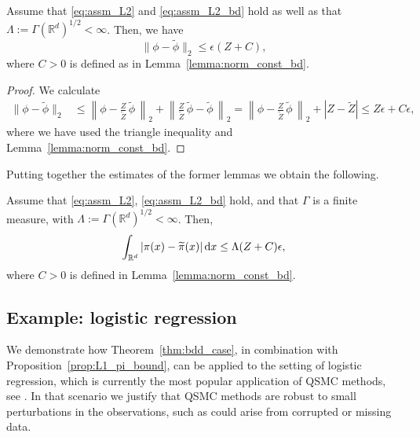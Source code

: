 \documentclass{aptpub}
\begin{document}
\begin{lemma}
    Assume that \eqref{eq:assm_L2} and \eqref{eq:assm_L2_bd} hold as well as that $\Lambda:= \Gamma(\mathbb{R}^d)^{1/2}<\infty$. Then, we have
    \begin{equation*}
        \|\phi-\widetilde \phi\|_2 \le \epsilon(Z+C),
    \end{equation*}
    where $C>0$ is defined as in Lemma~\ref{lemma:norm_const_bd}.
    \label{lemma:phi_2-bound}
\end{lemma}
\begin{proof}
    We calculate
    \begin{equation*}
        \begin{split}
            \|\phi-\widetilde \phi\|_2 &\le \left \|\phi - \frac{Z}{\widetilde Z}\,\widetilde \phi\,\right \|_2+\left \| \frac{Z}{\widetilde Z}\,\widetilde \phi - \widetilde \phi \,\right\|_2
            = \left \|\phi - \frac{Z}{\widetilde Z}\,\widetilde \phi\,\right \|_2+|Z-\widetilde Z| 
            \le Z\epsilon + C\epsilon, 
        \end{split}
    \end{equation*}
    where we have used the triangle inequality and Lemma~\ref{lemma:norm_const_bd}.
\end{proof}
Putting together the estimates of the former lemmas we obtain the following.
\begin{proposition}
    Assume that \eqref{eq:assm_L2}, \eqref{eq:assm_L2_bd} hold, and that $\Gamma$ is a finite measure, with $\Lambda := \Gamma(\mathbb{R}^d)^{1/2}<\infty$. Then, 
    \begin{equation*}
        \int_{\mathbb{R}^d} |\pi(x)-\widetilde \pi(x)|\dif x \le \Lambda(Z+C) \epsilon, 
    \end{equation*}
    where $C>0$ is defined in Lemma~\ref{lemma:norm_const_bd}.
    \label{prop:L1_pi_bound}
\end{proposition}



\subsection{Example: logistic regression}
\label{subsec:logistic}
We demonstrate how Theorem~\ref{thm:bdd_case}, in combination with Proposition~\ref{prop:L1_pi_bound}, can be applied to the setting of logistic regression, which is currently the most popular application of QSMC methods, see \cite{Pollock2020, Kumar2019}. In that scenario we justify that QSMC methods are robust to small perturbations in the observations, such as could arise from corrupted or missing data. 
\end{document}
